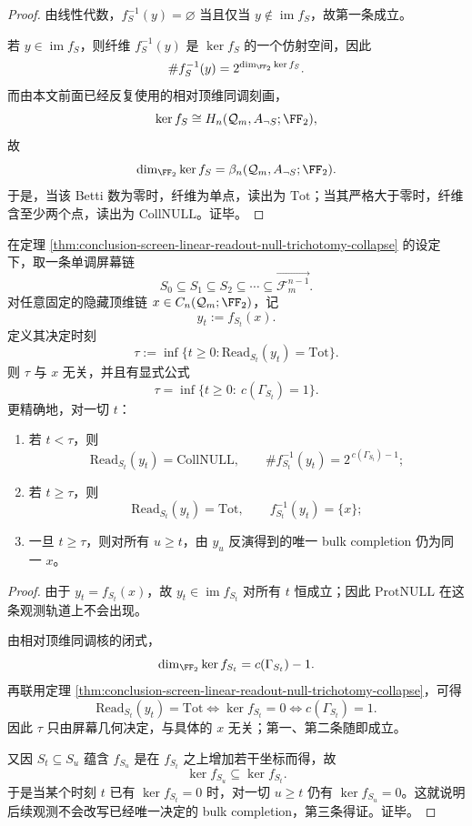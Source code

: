\begin{proof}
由线性代数，\(f_S^{-1}(y)=\varnothing\) 当且仅当 \(y\notin \operatorname{im}f_S\)，故第一条成立。

若 \(y\in \operatorname{im}f_S\)，则纤维 \(f_S^{-1}(y)\) 是 \(\ker f_S\) 的一个仿射空间，因此
\[
\#f_S^{-1}(y)=2^{\dim_{\FF_2}\ker f_S}.
\]
而由本文前面已经反复使用的相对顶维同调刻画，
\[
\ker f_S\cong H_n(\mathcal Q_m,A_{\neg S};\FF_2),
\]
故
\[
\dim_{\FF_2}\ker f_S=\beta_n(\mathcal Q_m,A_{\neg S};\FF_2).
\]
于是，当该 Betti 数为零时，纤维为单点，读出为 \(\mathrm{Tot}\)；当其严格大于零时，纤维含至少两个点，读出为 \(\mathrm{CollNULL}\)。证毕。
\end{proof}

\begin{theorem}[延迟观测的几何决定时刻]\label{thm:conclusion-screen-delayed-observation-geometric-decision-time}
在定理 \ref{thm:conclusion-screen-linear-readout-null-trichotomy-collapse} 的设定下，取一条单调屏幕链
\[
S_0\subseteq S_1\subseteq S_2\subseteq \cdots \subseteq \overrightarrow{\mathcal F_m^{n-1}}.
\]
对任意固定的隐藏顶维链 \(x\in C_n(\mathcal Q_m;\FF_2)\)，记
\[
y_t:=f_{S_t}(x).
\]
定义其决定时刻
\[
\tau:=\inf\{t\ge 0:\mathrm{Read}_{S_t}(y_t)=\mathrm{Tot}\}.
\]
则 \(\tau\) 与 \(x\) 无关，并且有显式公式
\[
\tau=\inf\{t\ge 0:\ c(\Gamma_{S_t})=1\}.
\]
更精确地，对一切 \(t\)：
\begin{enumerate}
  \item 若 \(t<\tau\)，则
        \[
        \mathrm{Read}_{S_t}(y_t)=\mathrm{CollNULL},
        \qquad
        \#f_{S_t}^{-1}(y_t)=2^{\,c(\Gamma_{S_t})-1};
        \]
  \item 若 \(t\ge \tau\)，则
        \[
        \mathrm{Read}_{S_t}(y_t)=\mathrm{Tot},
        \qquad
        f_{S_t}^{-1}(y_t)=\{x\};
        \]
  \item 一旦 \(t\ge \tau\)，则对所有 \(u\ge t\)，由 \(y_u\) 反演得到的唯一 bulk completion 仍为同一 \(x\)。
\end{enumerate}
\end{theorem}

\begin{proof}
由于 \(y_t=f_{S_t}(x)\)，故 \(y_t\in \operatorname{im}f_{S_t}\) 对所有 \(t\) 恒成立；因此 \(\mathrm{ProtNULL}\) 在这条观测轨道上不会出现。

由相对顶维同调核的闭式，
\[
\dim_{\FF_2}\ker f_{S_t}=c(\Gamma_{S_t})-1.
\]
再联用定理 \ref{thm:conclusion-screen-linear-readout-null-trichotomy-collapse}，可得
\[
\mathrm{Read}_{S_t}(y_t)=\mathrm{Tot}
\iff
\ker f_{S_t}=0
\iff
c(\Gamma_{S_t})=1.
\]
因此 \(\tau\) 只由屏幕几何决定，与具体的 \(x\) 无关；第一、第二条随即成立。

又因 \(S_t\subseteq S_u\) 蕴含 \(f_{S_u}\) 是在 \(f_{S_t}\) 之上增加若干坐标而得，故
\[
\ker f_{S_u}\subseteq \ker f_{S_t}.
\]
于是当某个时刻 \(t\) 已有 \(\ker f_{S_t}=0\) 时，对一切 \(u\ge t\) 仍有 \(\ker f_{S_u}=0\)。这就说明后续观测不会改写已经唯一决定的 bulk completion，第三条得证。证毕。
\end{proof}

